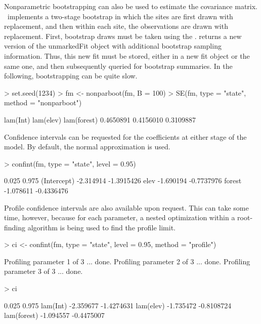 \documentclass[article,shortnames]{jss}
\newcommand{\um}{\pkg{unmarked}}
\begin{document}
Nonparametric bootstrapping can also be used to estimate the
covariance matrix. \um\ implements a two-stage bootstrap in which the
sites are first drawn with replacement, and then within each site, the
observations are drawn with replacement.  First, bootstrap draws must
be taken using the .   returns a new
version of the unmarkedFit object with additional bootstrap sampling
information.  Thus, this new fit must be stored, either in a new fit
object or the same one, and then subsequently queried for bootstrap
summaries.  In the following, bootstrapping can be quite slow.

\begin{Schunk}
\begin{Sinput}
> set.seed(1234)
> fm <- nonparboot(fm, B = 100)
> SE(fm, type = "state", method = "nonparboot")
\end{Sinput}
\begin{Soutput}
   lam(Int)   lam(elev) lam(forest) 
  0.4650891   0.4156010   0.3109887 
\end{Soutput}
\end{Schunk}

Confidence intervals can be requested for the coefficients at either
stage of the model.  By default, the normal approximation is used.

\begin{Schunk}
\begin{Sinput}
> confint(fm, type = "state", level = 0.95)
\end{Sinput}
\begin{Soutput}
                0.025      0.975
(Intercept) -2.314914 -1.3915426
elev        -1.690194 -0.7737976
forest      -1.078611 -0.4336476
\end{Soutput}
\end{Schunk}

Profile confidence intervals are also available upon request.  This
can take some time, however, because for each parameter, a nested
optimization within a root-finding algorithm is being used to find the
profile limit.

\begin{Schunk}
\begin{Sinput}
> ci <- confint(fm, type = "state", level = 0.95, method = "profile")
\end{Sinput}
\begin{Soutput}
Profiling parameter 1 of 3 ... done.
Profiling parameter 2 of 3 ... done.
Profiling parameter 3 of 3 ... done.
\end{Soutput}
\begin{Sinput}
> ci
\end{Sinput}
\begin{Soutput}
                0.025      0.975
lam(Int)    -2.359677 -1.4274631
lam(elev)   -1.735472 -0.8108724
lam(forest) -1.094557 -0.4475007
\end{Soutput}
\end{Schunk}
\end{document}
